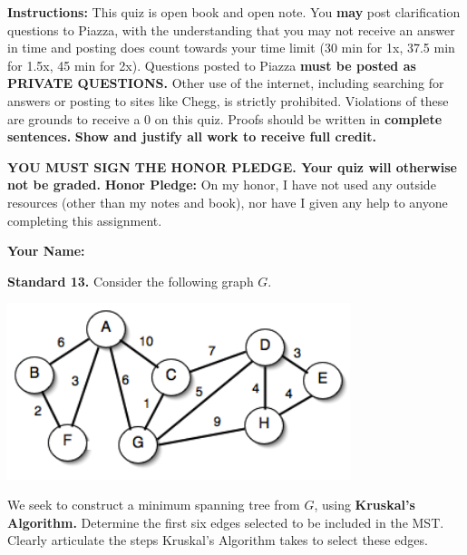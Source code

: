 \documentclass[11pt]{article}
\begin{document}
\renewcommand{\headrulewidth}{0.5pt}

\phantom{Test}

\begin{small}
\noindent \textbf{Instructions:} This quiz is open book and open note. You \textbf{may} post clarification questions to Piazza, with the understanding that you may not receive an answer in time and posting does count towards your time limit (30 min for 1x, 37.5 min for 1.5x, 45 min for 2x). Questions posted to Piazza \textbf{must be posted as PRIVATE QUESTIONS.} Other use of the internet, including searching for answers or posting to sites like Chegg, is strictly prohibited. Violations of these are grounds to receive a 0 on this quiz. Proofs should be written in \textbf{complete sentences.} \textbf{Show and justify all work to receive full credit.} 

\noindent \textbf{YOU MUST SIGN THE HONOR PLEDGE. Your quiz will otherwise not be graded.}  
\noindent \textbf{Honor Pledge:} On my honor, I have not used any outside resources (other than my notes and book), nor have I given any help to anyone completing this assignment. 

\noindent \textbf{Your Name:} \underline{\hskip 250pt}
\end{small} 

\hrulefill 

\noindent  \textbf{Standard 13.} Consider the following graph $G$.
\begin{center}
\includegraphics[width=10cm]{mst0404.png}
\end{center}

\noindent We seek to construct a minimum spanning tree from $G$, using \textbf{Kruskal's Algorithm.} Determine the first six edges selected to be included in the MST. Clearly articulate the steps Kruskal's Algorithm takes to select these edges.

\pagebreak
\end{document}
